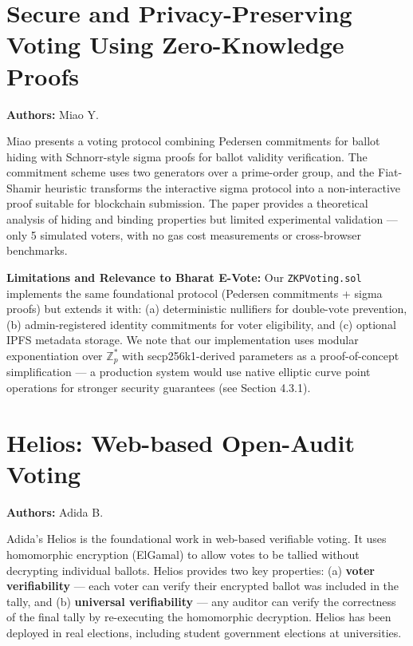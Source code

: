 \documentclass[oneside,a4paper,12pt]{book}
\begin{document}
\section{Secure and Privacy-Preserving Voting Using Zero-Knowledge Proofs}
\textbf{Authors:} Miao Y. \cite{miao2023}

Miao presents a voting protocol combining Pedersen commitments for ballot hiding with Schnorr-style sigma proofs for ballot validity verification. The commitment scheme uses two generators over a prime-order group, and the Fiat-Shamir heuristic transforms the interactive sigma protocol into a non-interactive proof suitable for blockchain submission. The paper provides a theoretical analysis of hiding and binding properties but limited experimental validation --- only 5 simulated voters, with no gas cost measurements or cross-browser benchmarks.

\textbf{Limitations and Relevance to Bharat E-Vote:} Our \texttt{ZKPVoting.sol} implements the same foundational protocol (Pedersen commitments + sigma proofs) but extends it with: (a) deterministic nullifiers for double-vote prevention, (b) admin-registered identity commitments for voter eligibility, and (c) optional IPFS metadata storage. We note that our implementation uses modular exponentiation over $\mathbb{Z}_p^*$ with secp256k1-derived parameters as a proof-of-concept simplification --- a production system would use native elliptic curve point operations for stronger security guarantees (see Section 4.3.1).

\section{Helios: Web-based Open-Audit Voting}
\textbf{Authors:} Adida B. \cite{adida2008}

Adida's Helios is the foundational work in web-based verifiable voting. It uses homomorphic encryption (ElGamal) to allow votes to be tallied without decrypting individual ballots. Helios provides two key properties: (a) \textbf{voter verifiability} --- each voter can verify their encrypted ballot was included in the tally, and (b) \textbf{universal verifiability} --- any auditor can verify the correctness of the final tally by re-executing the homomorphic decryption. Helios has been deployed in real elections, including student government elections at universities.
\end{document}
